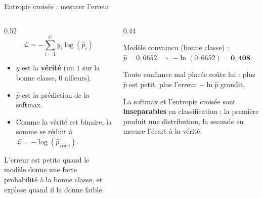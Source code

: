 \begin{frame}{Entropie croisée : mesurer l'erreur}
\begin{columns}[t]
\begin{column}{0.52\textwidth}
\[
\mathcal{L} = -\sum_{i=1}^{C} y_i \log(\hat{p}_i)
\]
\begin{itemize}
  \item $y$ est la \textbf{vérité} (un $1$ sur la bonne classe, $0$ ailleurs).
  \item $\hat{p}$ est la prédiction de la softmax.
  \item Comme la vérité est binaire, la somme se réduit à
  $\mathcal{L} = -\log(\hat{p}_{\text{vraie}})$.
\end{itemize}
\begin{kbox}[Lecture]
L'erreur est petite quand le modèle donne une forte probabilité à la bonne
classe, et explose quand il la donne faible.
\end{kbox}
\end{column}
\begin{column}{0.44\textwidth}
\begin{ebox}
Modèle convaincu (bonne classe) : $\hat{p} = 0{,}6652$ $\Rightarrow$
$- \ln(0{,}6652) = \mathbf{0{,}408}$.

\medskip
Toute confiance mal placée coûte lui : plus $\hat{p}$ est petit, plus l'erreur
$- \ln \hat{p}$ grandit.
\end{ebox}
\begin{wbox}
La softmax et l'entropie croisée sont \textbf{inseparables} en classification : la
première produit une distribution, la seconde en mesure l'écart à la vérité.
\end{wbox}
\end{column}
\end{columns}
\end{frame}

